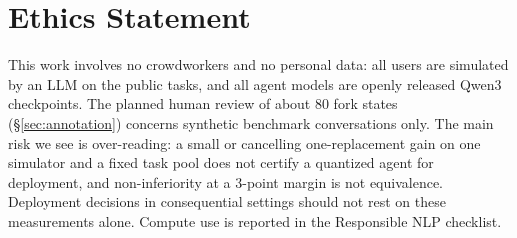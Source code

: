 \section*{Ethics Statement}

This work involves no crowdworkers and no personal data: all users are simulated by an LLM on the public \tautwo{} tasks, and all agent models are openly released Qwen3 checkpoints. The planned human review of about 80 fork states (\S\ref{sec:annotation}) concerns synthetic benchmark conversations only.  The main risk we see is over-reading: a small or cancelling one-replacement gain on one simulator and a fixed task pool does not certify a quantized agent for deployment, and non-inferiority at a 3-point margin is not equivalence. Deployment decisions in consequential settings should not rest on these measurements alone. Compute use is reported in the Responsible NLP checklist.
